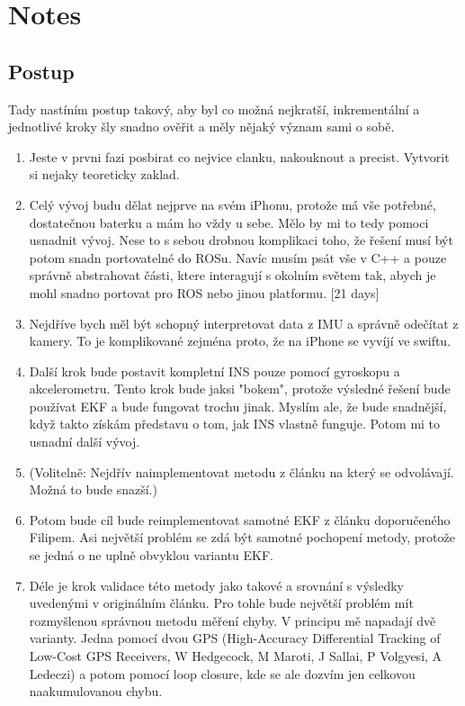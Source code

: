 \chapter{Notes}

\section{Postup}

Tady nastíním postup takový, aby byl co možná nejkratší, inkrementální a jednotlivé kroky šly snadno ověřit a měly nějaký význam sami o sobě.

\begin{enumerate}

\item Jeste v prvni fazi posbirat co nejvice clanku, nakouknout a precist. Vytvorit si nejaky teoreticky zaklad.

\item Celý vývoj budu dělat nejprve na svém iPhonu, protože má vše potřebné, dostatečnou baterku a mám ho vždy u sebe. Mělo by mi to tedy pomoci usnadnit vývoj. Nese to s sebou drobnou komplikaci toho, že řešení musí být potom snadn portovatelné do ROSu. Navíc musím psát vše v C++ a pouze správně abstrahovat části, ktere interagují s okolním světem tak, abych je mohl snadno portovat pro ROS nebo jinou platformu.
[21 days]

\item Nejdříve bych měl být schopný interpretovat data z IMU a správně odečítat z kamery. To je komplikované zejména proto, že na iPhone se vyvíjí ve swiftu.

\item Další krok bude postavit kompletní INS pouze pomocí gyroskopu a akcelerometru. Tento krok bude jaksi "bokem", protože výsledné řešení bude používat EKF a bude fungovat trochu jinak. Myslím ale, že bude snadnější, když takto získám představu o tom, jak INS vlastně funguje. Potom mi to usnadní další vývoj.

\item (Volitelně: Nejdřív naimplementovat metodu z článku na který se odvolávají. Možná to bude snazší.) 

\item Potom bude cíl bude reimplementovat samotné EKF z článku doporučeného Filipem. Asi největší problém se zdá být samotné pochopení metody, protože se jedná o ne uplně obvyklou variantu EKF. 

\item Déle je krok validace této metody jako takové a srovnání s výsledky uvedenými v originálním článku. Pro tohle bude největší problém mít rozmyšlenou správnou metodu měření chyby. V principu mě napadají dvě varianty. Jedna pomocí dvou GPS (High-Accuracy Differential Tracking of Low-Cost GPS Receivers, W Hedgecock, M Maroti, J Sallai, P Volgyesi, A Ledeczi) a potom pomocí loop closure, kde se ale dozvím jen celkovou naakumulovanou chybu.


\end{enumerate}
